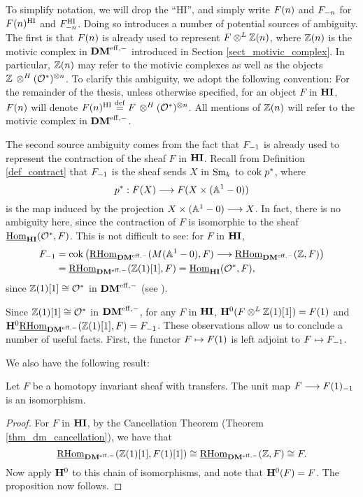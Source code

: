 \begin{rmk}\label{rmk_contraction}
To simplify notation, we will drop the ``HI'', and simply write 
$\LHI[n]{F}$ and $\RHI[n]{F}$ for $\LHIs[n]{F}$ and $\RHIs[n]{F}$.
Doing so introduces a number of potential sources of ambiguity. 
The first is that $\LHI[n]{F}$ is already used to represent $F 
\tDM \Z(n)$, where $\Z(n)$ is the motivic complex in $\DMeff$ 
introduced in Section \ref{sect_motivic_complex}. In particular, 
$\LHI[n]{\Z}$ may refer to the motivic complexes as well as the 
objects $\Z \tHI (\Ox)^{\tensor n}$. To clarify this ambiguity, we 
adopt the following convention: For the remainder of the thesis, 
unless otherwise specified, for an object $F$ in $\HI$, 
$\LHI[n]{F}$ will denote $\LHIs[n]{F} \defeq F \tHI 
(\Ox)^{\tensor n}$. All mentions of $\Z(n)$ will refer to the 
motivic complex in $\DMeff$.

The second source ambiguity comes from the fact that $\RHI{F}$ is 
already used to represent the contraction of the sheaf $F$ in $\HI$. 
Recall from Definition \ref{def_contract} that $\RHI{F}$ is the 
sheaf sends $X$ in $\Sm$ to $\cok p^*$, where
\[
p^* : F(X) \to F(X \times (\A^1 - 0))
\]
is the map induced by the projection $X \times (\A^1 - 0) \to X$.
In fact, there is no ambiguity here, since the contraction of $F$ 
is isomorphic to the sheaf $\ihomHI(\Ox, F)$. This is not 
difficult to see: for $F$ in $\HI$,
\begin{align*}
\RHI{F} &= \mathrm{cok}\left(\ihomDMf(M(\A^1 - 0), F) \to \ihomDMf(\Z, F)\right) \\
&= \ihomDMf(\Z(1)[1], F) = \ihomHI(\Ox, F),
\end{align*}
since $\Z(1)[1] \cong \Ox$ in $\DMeff$ (see \cite[4.1]{MVW}).
\end{rmk}

Since $\Z(1)[1] \cong \O^*$ in $\DMeff$, for any $F$ in $\HI$, 
$\HH^0(F \tDM \Z(1)[1]) = \LHI{F}$ and $\HH^0\ihomDMf(\Z(1)[1], F) 
= \RHI{F}$. These observations allow us to conclude a number of useful
facts. First, the functor $F \mapsto \LHI{F}$ is left adjoint to 
$F \mapsto \RHI{F}$. 

We also have the following result:

\begin{prop}\label{prop_unit_iso}
Let $F$ be a homotopy invariant sheaf with transfers. The unit map 
$F \to \RHI{\LHI{F}}$ is an isomorphism.
\end{prop}
\begin{proof}
For $F$ in $\HI$, by the Cancellation Theorem 
(Theorem \ref{thm_dm_cancellation}), we have that 
\[
\ihomDMf(\Z(1)[1], F(1)[1]) \cong \ihomDMf(\Z, F) 
\cong F. 
\]
Now apply $\HH^0$ to this chain of isomorphisms, and note 
that $\HH^0(F) = F$. The proposition now follows.
\end{proof}

